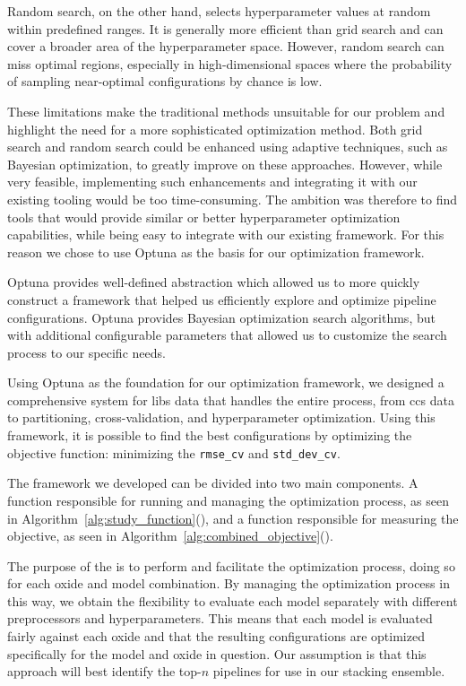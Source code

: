 Random search, on the other hand, selects hyperparameter values at random within predefined ranges. 
It is generally more efficient than grid search and can cover a broader area of the hyperparameter space. 
However, random search can miss optimal regions, especially in high-dimensional spaces where the probability of sampling near-optimal configurations by chance is low. 

These limitations make the traditional methods unsuitable for our problem and highlight the need for a more sophisticated optimization method.
Both grid search and random search could be enhanced using adaptive techniques, such as Bayesian optimization, to greatly improve on these approaches.
However, while very feasible, implementing such enhancements and integrating it with our existing tooling would be too time-consuming.
The ambition was therefore to find tools that would provide similar or better hyperparameter optimization capabilities, while being easy to integrate with our existing framework.
For this reason we chose to use Optuna as the basis for our optimization framework\cite{optuna_2019}.

Optuna provides well-defined abstraction which allowed us to more quickly construct a framework that helped us efficiently explore and optimize pipeline configurations\cite{optuna_2019}.
Optuna provides Bayesian optimization search algorithms, but with additional configurable parameters that allowed us to customize the search process to our specific needs.

Using Optuna as the foundation for our optimization framework, we designed a comprehensive system for \gls{libs} data that handles the entire process, from \gls{ccs} data to partitioning, cross-validation, and hyperparameter optimization.
Using this framework, it is possible to find the best configurations by optimizing the objective function: minimizing the \texttt{rmse\_cv} and \texttt{std\_dev\_cv}.

The framework we developed can be divided into two main components.
A function responsible for running and managing the optimization process, as seen in Algorithm~\ref{alg:study_function}(), and a function responsible for measuring the objective, as seen in Algorithm~\ref{alg:combined_objective}().

The purpose of the  is to perform and facilitate the optimization process, doing so for each oxide and model combination.
By managing the optimization process in this way, we obtain the flexibility to evaluate each model separately with different preprocessors and hyperparameters.
This means that each model is evaluated fairly against each oxide and that the resulting configurations are optimized specifically for the model and oxide in question.
Our assumption is that this approach will best identify the top-$n$ pipelines for use in our stacking ensemble.

